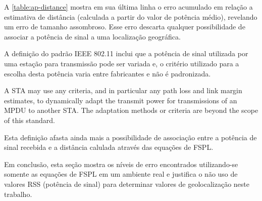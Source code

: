 \begin{table}[htb]
\end{table}

A \autoref{table:ap-distance} mostra em sua última linha o erro acumulado
em relação a estimativa de distância (calculada a partir do valor de
potência médio), revelando um erro de tamanho assombroso.
Esse erro descarta qualquer possibilidade de associar a potência de sinal a uma
localização geográfica.

A definição do padrão IEEE 802.11 inclui que a potência de sinal
utilizada por uma estação para transmissão pode ser variada e, o critério utilizado
para a escolha desta potência varia entre fabricantes e não é padronizada.

\begin{citacao}[english]

	A STA may use any criteria, and in particular any path loss and link margin
	estimates, to dynamically adapt the transmit power for transmissions of an
	MPDU to another STA. The adaptation methods or criteria are beyond the scope
	of this standard. \

\end{citacao}

Esta definição afasta ainda mais a possibilidade de associação entre a potência
de sinal recebida e a distância calulada através das equações de FSPL.

Em conclusão, esta seção mostra os níveis de erro encontrados
utilizando-se somente as equações de FSPL em um ambiente real e justifica o não
uso de valores RSS (potência de sinal) para determinar valores de geolocalização neste trabalho.
